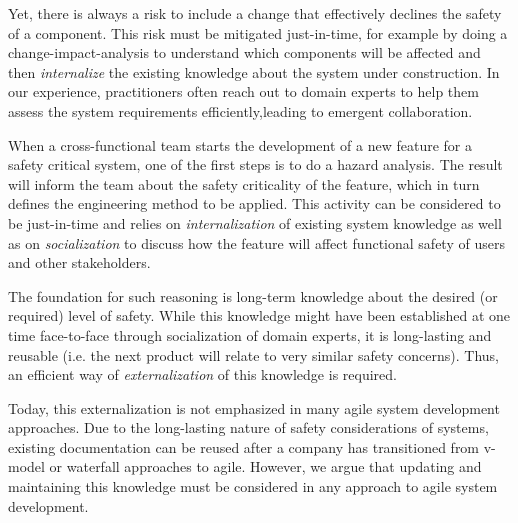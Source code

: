 Yet, there is always a risk to include a change %
that effectively declines the safety of a component.
This risk must be mitigated just-in-time, for example by doing a change-impact-analysis to understand which components will be affected and then \emph{internalize} the existing knowledge about the system under construction.
In our experience, practitioners often reach out to domain experts to help them assess the system requirements efficiently,leading to emergent collaboration.

When a cross-functional team starts the development of a new feature for a safety critical system, one of the first steps is to do a hazard analysis. 
The result will inform the team about the safety criticality of the feature, which in turn defines the engineering method to be applied. 
This activity can be considered to be just-in-time and relies on \emph{internalization} of existing system knowledge as well as on \emph{socialization} to discuss how the feature will affect functional safety of users and other stakeholders. 

The foundation for such reasoning is long-term knowledge about the desired (or required) level of safety. 
While this knowledge might have been established at one time face-to-face through socialization of domain experts, it is long-lasting and reusable (i.e. the next product will relate to very similar safety concerns). 
Thus, an efficient way of \emph{externalization} of this knowledge is required. 

Today, this externalization is not emphasized in many agile system development approaches.
Due to the long-lasting nature of safety considerations of systems, existing documentation can be reused after a company has transitioned from v-model or waterfall approaches to agile. 
However, we argue that updating and maintaining this knowledge must be considered in any approach to agile system development.